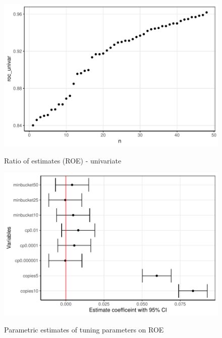\documentclass[12pt]{article}
\begin{document}
\begin{figure}[!h]
    \centering
    \caption{Ratio of estimates (ROE) - univariate}
    \includegraphics{../graphs/synthpop/graph_synthpop_roc_univar_raw.pdf}
    \label{graph_synthpop_roc_univar_raw}
\end{figure}

\begin{figure}[!h]
    \centering
    \caption{Parametric estimates of tuning parameters on ROE}
    \includegraphics{../graphs/synthpop/graph_synthpop_roc_univar.pdf}
    \label{graph_synthpop_roc_univar}
\end{figure}
\end{document}
